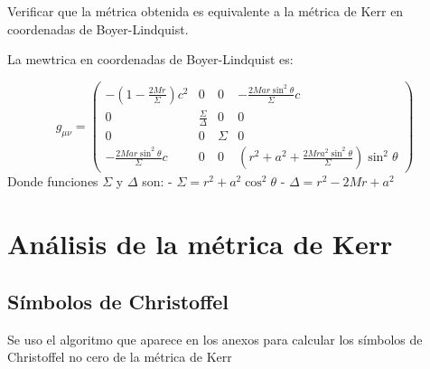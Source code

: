 \begin{task}
    Verificar que la métrica obtenida es equivalente a la métrica de Kerr en coordenadas de Boyer-Lindquist.

\end{task}
La mewtrica en coordenadas de Boyer-Lindquist es:

\begin{equation}
    g_{\mu \nu}=\left(\begin{array}{cccc}
-\left(1-\frac{2 M r}{\Sigma}\right) c^2 & 0 & 0 & -\frac{2 M a r \sin ^2 \theta}{\Sigma} c \\
0 & \frac{\Sigma}{\Delta} & 0 & 0 \\
0 & 0 & \Sigma & 0 \\
-\frac{2 M a r \sin ^2 \theta}{\Sigma} c & 0 & 0 & \left(r^2+a^2+\frac{2 M r a^2 \sin ^2 \theta}{\Sigma}\right) \sin ^2 \theta
\end{array}\right)
    \label{eq:MetricaKerrBL}
\end{equation}
Donde funciones $\Sigma$ y $\Delta$ son:
- $\Sigma=r^2+a^2 \cos ^2 \theta$
- $\Delta=r^2-2 M r+a^2$

\section{Análisis de la métrica de Kerr}
\subsection{Símbolos de Christoffel}
Se uso el algoritmo que aparece en los anexos para calcular los símbolos de Christoffel no cero de la métrica de Kerr
